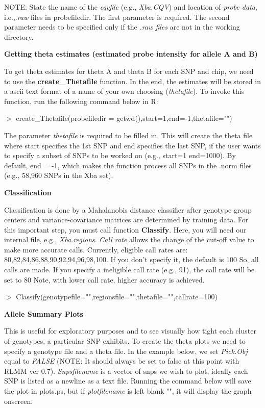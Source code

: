 \documentclass[12pt]{article}
\begin{document}
\noindent
NOTE: State the name of the {\it cqvfile} (e.g., {\it Xba.CQV}) and location of {\it probe data}, i.e.,.{\it raw} files
in probefiledir. The first parameter is required. The second parameter needs to be specified only if the {\it .raw files}
are not in the working directory. 

\medskip
\noindent
{\bf Getting theta estimates (estimated probe intensity for allele A and B)}  
\smallskip

\noindent
To get theta estimates for theta A and theta B for each SNP and chip, we need to use the {\bf create\_Thetafile} function. In the end,
the estimates will be stored in a ascii text format of a name of your own choosing ({\it thetafile}). To invoke this function, run
the following command below in R:

\medskip
\noindent
$>$ create\_Thetafile(probefiledir = getwd(),start=1,end=-1,thetafile="")

\medskip
\noindent
The parameter {\it thetafile} is required to be filled in. This will create the theta file where start specifies the 1st SNP and end 
specifies the last SNP, if the user wants to specify a subset of SNPs to be worked on (e.g., start=1 end=1000).
By default, end = -1, which makes the function process all SNPs in the .norm files (e.g., 58,960 SNPs in the Xba set).

\medskip
\noindent
{\bf Classification}
\smallskip

\noindent
Classification is done by a Mahalanobis distance classifier after genotype group centers and variance-covariance matrices are 
determined by training data. For this important step, you must call function {\bf Classify}. Here, you will need our internal
file, e.g., {\it Xba.regions}. {\it Call rate} allows the change of the cut-off value to make more accurate calls. 
Currently, eligible call rates are: 80,82,84,86,88,90,92,94,96,98,100. If you don't specify it, the default is 100%
So, all calls are made. If you specify a ineligible call rate (e.g., 91), the call rate will be set to 80%
Note, with lower call rate, higher accuracy is achieved.

\medskip
\noindent
$>$ Classify(genotypefile="",regionsfile="",thetafile="",callrate=100)

\medskip
\noindent
{\bf Allele Summary Plots}
\smallskip

\noindent

This is useful for exploratory purposes and to see visually how tight each cluster of genotypes, a particular SNP exhibits.
To create the theta plots we need to specify a genotype file and a theta file. 
In the example below, we set {\it Pick.Obj} equal to {\it FALSE} (NOTE: It should always be set to false at this point with RLMM ver 0.7).
{\it Snpsfilename} is a vector of snps we wish to plot, ideally each SNP is listed as a newline as a text file. Running the command 
below will save the plot in plots.ps, but if {\it plotfilename} is left blank "", it will display the graph onscreen.
\end{document}

